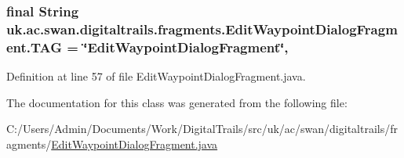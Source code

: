 \hypertarget{classuk_1_1ac_1_1swan_1_1digitaltrails_1_1fragments_1_1_edit_waypoint_dialog_fragment_aad167dcd2594b995b34e0c2e018596ef}{
\subsubsection[{T\+A\+G}]{\setlength{\rightskip}{0pt plus 5cm}final String uk.\+ac.\+swan.\+digitaltrails.\+fragments.\+Edit\+Waypoint\+Dialog\+Fragment.\+T\+A\+G = \char`\"{}Edit\+Waypoint\+Dialog\+Fragment\char`\"{}\hspace{0.3cm}{\ttfamily [static]}, {\ttfamily [private]}}}\label{classuk_1_1ac_1_1swan_1_1digitaltrails_1_1fragments_1_1_edit_waypoint_dialog_fragment_aad167dcd2594b995b34e0c2e018596ef}


Definition at line 57 of file Edit\+Waypoint\+Dialog\+Fragment.\+java.



The documentation for this class was generated from the following file\+:\begin{DoxyCompactItemize}
\item 
C\+:/\+Users/\+Admin/\+Documents/\+Work/\+Digital\+Trails/src/uk/ac/swan/digitaltrails/fragments/\hyperlink{_edit_waypoint_dialog_fragment_8java}{Edit\+Waypoint\+Dialog\+Fragment.\+java}\end{DoxyCompactItemize}

